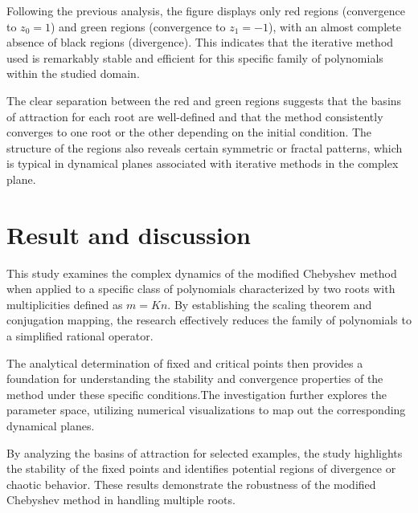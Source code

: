 \documentclass{article}
\theoremstyle{definition}
\theoremstyle{remark}
\begin{document}
Following the previous analysis, the figure displays only red regions (convergence to \( z_0 = 1 \)) and green regions (convergence to \( z_1 = -1 \)), with an almost complete absence of black regions (divergence). This indicates that the iterative method used is remarkably stable and efficient for this specific family of polynomials within the studied domain.

The clear separation between the red and green regions suggests that the basins of attraction for each root are well-defined and that the method consistently converges to one root or the other depending on the initial condition. The structure of the regions also reveals certain symmetric or fractal patterns, which is typical in dynamical planes associated with iterative methods in the complex plane.

\section{Result and discussion}

This study examines the complex dynamics of the modified Chebyshev method when applied to a specific class of polynomials characterized by two roots with multiplicities defined as $m = Kn$. By establishing the scaling theorem and conjugation mapping, the research effectively reduces the family of polynomials to a simplified rational operator. 

The analytical determination of fixed and critical points then provides a foundation for understanding the stability and convergence properties of the method under these specific conditions.The investigation further explores the parameter space, utilizing numerical visualizations to map out the corresponding dynamical planes. 

By analyzing the basins of attraction for selected examples, the study highlights the stability of the fixed points and identifies potential regions of divergence or chaotic behavior. These results demonstrate the robustness of the modified Chebyshev method in handling multiple roots.



\end{document}
